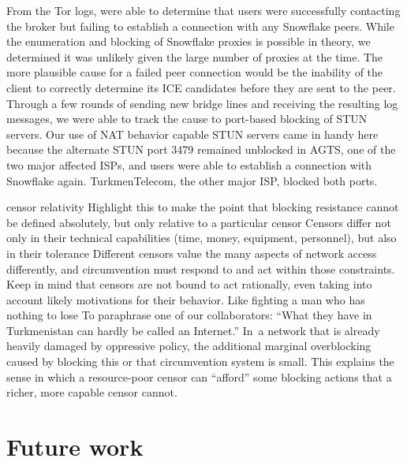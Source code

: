 \documentclass[letterpaper,twocolumn]{article}
\begin{document}
From the Tor logs, were able to determine that users were successfully contacting the broker but failing to 
establish a connection with any Snowflake peers.
While the enumeration and blocking of Snowflake proxies is 
possible in theory, we determined it was unlikely given the large number of proxies at the time.
The more plausible cause for a failed peer connection would be the inability of the client to correctly determine 
its ICE candidates before they are sent to the peer. Through a few rounds of sending new bridge lines and receiving 
the resulting log messages, we were able to track the cause to port-based blocking of STUN servers.
Our use of NAT behavior capable STUN servers came in handy here because the alternate STUN port 3479 remained
unblocked in AGTS, one of the two major affected ISPs, and users were able to establish a connection
with Snowflake again. TurkmenTelecom, the other major ISP, blocked both ports.


censor relativity
Highlight this to make the point that blocking resistance cannot be defined absolutely,
but only relative to a particular censor
Censors differ not only in their technical capabilities
(time, money, equipment, personnel),
but also in their tolerance
Different censors value the many aspects of network access differently,
and circumvention must respond to and act within those constraints.
Keep in mind that censors are not bound to act rationally,
even taking into account likely motivations for their behavior.
Like fighting a man who has nothing to lose
To paraphrase one of our collaborators:
``What they have in Turkmenistan can hardly be called an Internet.''
In~a network that is already heavily damaged by oppressive policy,
the additional marginal overblocking caused by blocking
this or that circumvention system is small.
This explains the sense in which a resource-poor censor
can ``afford'' some blocking actions
that a richer, more capable censor cannot.

\section{Future work}
\label{sec:future}
\end{document}
